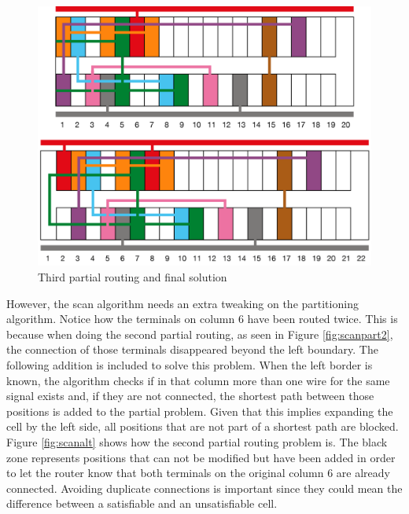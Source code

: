 \begin{figure}[h!]
  \centering
  \includegraphics[scale=0.5]{img/design/scantotal3.png}
  \caption{Third partial routing and final solution}
  \label{fig:scantotal3}
\end{figure} 


However, the scan algorithm needs an extra tweaking on the partitioning algorithm. Notice how the terminals on column 6 have been routed twice. This is because when doing the second partial routing, as seen in Figure \ref{fig:scanpart2}, the connection of those terminals disappeared beyond the left boundary. The following addition is included to solve this problem. When the left border is known, the algorithm checks if in that column more than one wire for the same signal exists and, if they are not connected, the shortest path between those positions is added to the partial problem. Given that this implies expanding the cell by the left side, all positions that are not part of a shortest path are blocked. Figure \ref{fig:scanalt} shows how the second partial routing problem is. The black zone represents positions that can not be modified but have been added in order to let the router know that both terminals on the original column 6 are already connected. Avoiding duplicate connections is important since they could mean the difference between a satisfiable and an unsatisfiable cell. \\

